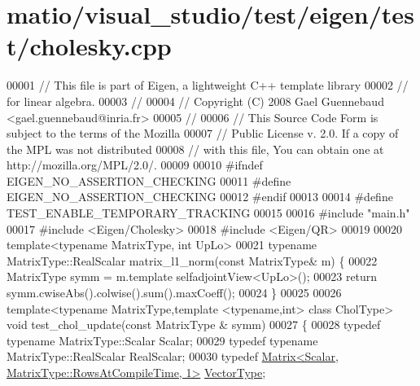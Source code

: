 \hypertarget{matio_2visual__studio_2test_2eigen_2test_2cholesky_8cpp_source}{}\section{matio/visual\+\_\+studio/test/eigen/test/cholesky.cpp}
\label{matio_2visual__studio_2test_2eigen_2test_2cholesky_8cpp_source}

\begin{DoxyCode}
00001 \textcolor{comment}{// This file is part of Eigen, a lightweight C++ template library}
00002 \textcolor{comment}{// for linear algebra.}
00003 \textcolor{comment}{//}
00004 \textcolor{comment}{// Copyright (C) 2008 Gael Guennebaud <gael.guennebaud@inria.fr>}
00005 \textcolor{comment}{//}
00006 \textcolor{comment}{// This Source Code Form is subject to the terms of the Mozilla}
00007 \textcolor{comment}{// Public License v. 2.0. If a copy of the MPL was not distributed}
00008 \textcolor{comment}{// with this file, You can obtain one at http://mozilla.org/MPL/2.0/.}
00009 
00010 \textcolor{preprocessor}{#ifndef EIGEN\_NO\_ASSERTION\_CHECKING}
00011 \textcolor{preprocessor}{#define EIGEN\_NO\_ASSERTION\_CHECKING}
00012 \textcolor{preprocessor}{#endif}
00013 
00014 \textcolor{preprocessor}{#define TEST\_ENABLE\_TEMPORARY\_TRACKING}
00015 
00016 \textcolor{preprocessor}{#include "main.h"}
00017 \textcolor{preprocessor}{#include <Eigen/Cholesky>}
00018 \textcolor{preprocessor}{#include <Eigen/QR>}
00019 
00020 \textcolor{keyword}{template}<\textcolor{keyword}{typename} MatrixType, \textcolor{keywordtype}{int} UpLo>
00021 \textcolor{keyword}{typename} MatrixType::RealScalar matrix\_l1\_norm(\textcolor{keyword}{const} MatrixType& m) \{
00022   MatrixType symm = m.template selfadjointView<UpLo>();
00023   \textcolor{keywordflow}{return} symm.cwiseAbs().colwise().sum().maxCoeff();
00024 \}
00025 
00026 \textcolor{keyword}{template}<\textcolor{keyword}{typename} MatrixType,\textcolor{keyword}{template} <\textcolor{keyword}{typename},\textcolor{keywordtype}{int}> \textcolor{keyword}{class }CholType> \textcolor{keywordtype}{void} test\_chol\_update(\textcolor{keyword}{const} MatrixType
      & symm)
00027 \{
00028   \textcolor{keyword}{typedef} \textcolor{keyword}{typename} MatrixType::Scalar Scalar;
00029   \textcolor{keyword}{typedef} \textcolor{keyword}{typename} MatrixType::RealScalar RealScalar;
00030   \textcolor{keyword}{typedef} \hyperlink{group___core___module_class_eigen_1_1_matrix}{Matrix<Scalar, MatrixType::RowsAtCompileTime, 1>} 
      \hyperlink{struct_vector_type}{VectorType};

\end{DoxyCode}
